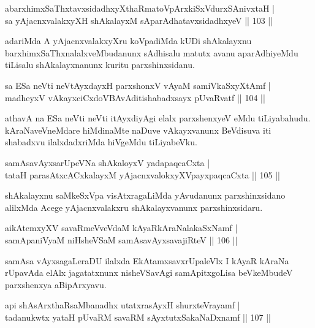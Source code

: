 \begin{shl}
abarxhimxSaThxtavxsidadhxyXthaRmatoV\s pArxkiSxVdurxSA\s nivxtaH |\\
sa yAjacnxvalakxyXH shAkalayxM sAparAdhatavxsidadhxyeV \hfill || 103 ||
\end{shl}

\begin{artha}
adariMda A yAjacnxvalakxyXru koVpadiMda kUDi shAkalayxnu barxhimxSaThxnalalxveMbudanunx sAdhisalu matutx avanu aparAdhiyeMdu tiLisalu shAkalayxnanunx kuritu parxshinxsidanu.
\end{artha}

\begin{shl}
sa ESa neVti neVtAyxdayxH parxshonxV vA\s yaM samiVkaSxyXtAmf |\\
madheyxV vAkayxciCxdoV\s BAvAditishabadxsayx pUvaRvatf \hfill || 104 ||
\end{shl}

\begin{artha}%
athavA na ESa neVti neVti itAyxdiyAgi elalx parxshenxyeV eMdu tiLiyabahudu. kAraNaveVneMdare hiMdinaMte naDuve vAkayxvanunx BeVdisuva iti shabadxvu ilalxdadxriMda hiVgeMdu tiLiyabeVku.
\end{artha}

\begin{shl}
samAsavAyxsarUpeVNa shAkaloyxV yadapaqcaCxta |\\
tataH parasAtxcACxkalayxM yAjacnxvalokxyXV\s payxpaqcaCxta \hfill || 105 ||
\end{shl}

\begin{artha}
shAkalayxnu saMkeSxVpa visAtxragaLiMda yAvudanunx parxshinxsidano alilxMda Acege yAjacnxvalakxru shAkalayxvanunx parxshinxsidaru.
\end{artha}


\begin{shl}
aikAtemxyXV savaRmeVveVdaM kAyaRkAraNalakaSxNamf |\\
samApaniVyaM niHsheVSaM samAsavAyxsavajiRteV \hfill || 106 ||
\end{shl}

\begin{artha}
samAsa vAyxsagaLeraDU ilalxda EkAtamxsavxrUpaleVlx I kAyaR kAraNa rUpavAda elAlx jagatatxnunx nisheVSavAgi samApitxgoLisa beVkeMbudeV parxshenxya aBipArxyavu.
\end{artha}

\begin{shl}
api shAsArxthaRsaMbanadhx utatxrasAyxH shurxteVrayamf |\\
tadanukwtx yataH pUvaRM savaRM sAyxtutxSakaNaDxnamf \hfill || 107 ||
\end{shl}

